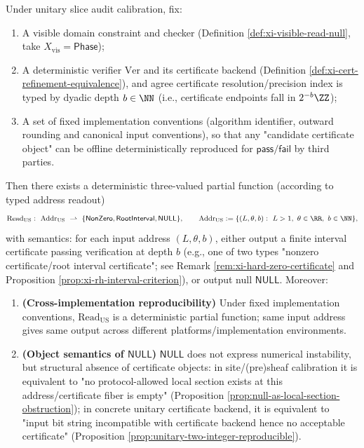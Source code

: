 \begin{theorem}\label{thm:xi-us-deterministic-tristate}
Under unitary slice audit calibration, fix:
\begin{enumerate}
  \item A visible domain constraint and checker (Definition \ref{def:xi-visible-read-null}, take \(X_{\mathrm{vis}}=\mathsf{Phase}\));
  \item A deterministic verifier \(\mathrm{Ver}\) and its certificate backend (Definition \ref{def:xi-cert-refinement-equivalence}), and agree certificate resolution/precision index is typed by dyadic depth \(b\in\NN\) (i.e., certificate endpoints fall in \(2^{-b}\ZZ\));
  \item A set of fixed implementation conventions (algorithm identifier, outward rounding and canonical input conventions), so that any "candidate certificate object" can be offline deterministically reproduced for \(\mathsf{pass}/\mathsf{fail}\) by third parties.
\end{enumerate}
Then there exists a deterministic three-valued partial function (according to typed address readout)
\[
\mathrm{Read}_{\mathrm{US}}:\ \mathrm{Addr}_{\mathrm{US}}\ \rightharpoonup\ \{\mathsf{NonZero},\mathsf{RootInterval},\mathsf{NULL}\},
\qquad
\mathrm{Addr}_{\mathrm{US}}:=\{(L,\theta,b):\ L>1,\ \theta\in\RR,\ b\in\NN\},
\]
with semantics: for each input address \((L,\theta,b)\), either output a finite interval certificate passing verification at depth \(b\) (e.g., one of two types "nonzero certificate/root interval certificate"; see Remark \ref{rem:xi-hard-zero-certificate} and Proposition \ref{prop:xi-rh-interval-criterion}), or output null \(\mathsf{NULL}\).
Moreover:
\begin{enumerate}
  \item \textbf{(Cross-implementation reproducibility)} Under fixed implementation conventions, \(\mathrm{Read}_{\mathrm{US}}\) is a deterministic partial function; same input address gives same output across different platforms/implementation environments.
  \item \textbf{(Object semantics of \(\mathsf{NULL}\))} \(\mathsf{NULL}\) does not express numerical instability, but structural absence of certificate objects: in site/(pre)sheaf calibration it is equivalent to "no protocol-allowed local section exists at this address/certificate fiber is empty" (Proposition \ref{prop:null-as-local-section-obstruction}); in concrete unitary certificate backend, it is equivalent to "input bit string incompatible with certificate backend hence no acceptable certificate" (Proposition \ref{prop:unitary-two-integer-reproducible}).
\end{enumerate}
\end{theorem}

